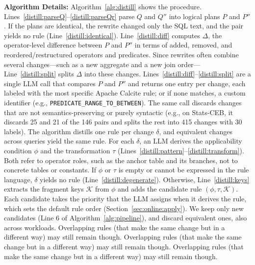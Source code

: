 \textbf{Algorithm Details:} Algorithm~\ref{alg:distill} shows the procedure.
Lines~\ref{distill:parseQ}--\ref{distill:parseQr} parse $Q$ and $Q''$ into logical plans $P$ and $P''$.
If the plans are identical, the rewrite changed only the SQL text, and the pair yields no rule (Line~\ref{distill:identical}).
Line~\ref{distill:diff} computes $\Delta$, the operator-level difference between $P$ and $P''$ in terms of added, removed, and reordered/restructured operators and predicates.
Since rewrites often combine several changes---such as a new aggregate and a new join order---Line~\ref{distill:split} splits $\Delta$ into these changes. Lines~\ref{distill:diff}--\ref{distill:split} are a single LLM call that compares $P$ and $P''$ and returns one entry per change, each labeled with the most specific Apache Calcite rule; or if none matches, a custom identifier (e.g., \texttt{PREDICATE\_\allowbreak RANGE\_\allowbreak TO\_\allowbreak BETWEEN}). The same call discards changes that are not semantics-preserving or purely syntactic (e.g., on Stats-CEB, it discards 25 and 21 of the 146 pairs and splits the rest into 415 changes with 30 labels). The algorithm distills one rule per change $\delta$, and equivalent changes across queries yield the same rule.
For each $\delta$, an LLM derives the applicability condition $\phi$ and the transformation $\tau$ (Lines~\ref{distill:pattern}--\ref{distill:transform}).
Both refer to operator roles, such as the anchor table and its branches, not to concrete tables or constants.
If $\phi$ or $\tau$ is empty or cannot be expressed in the rule language, $\delta$ yields no rule (Line~\ref{distill:degenerate}).
Otherwise, Line~\ref{distill:keys} extracts the fragment keys $\mathcal{K}$ from $\phi$ and adds the candidate rule $(\phi, \tau, \mathcal{K})$.
Each candidate takes the priority that the LLM assigns when it derives the rule, which sets the default rule order (Section~\ref{sec:online:apply}).
We keep only new candidates (Line 6 of Algorithm~\ref{alg:pipeline}), and discard equivalent ones, also across workloads.
Overlapping rules (that make the same change but in a different way) may still remain though.
Overlapping rules (that make the same change but in a different way) may still remain though.
Overlapping rules (that make the same change but in a different way) may still remain though.\shorten

